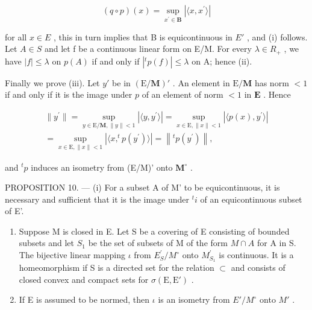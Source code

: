 \[
(q \circ p) (x) = \sup _ {x ^ {\prime} \in \mathbf {B}} | \langle x, x ^ {\prime} \rangle |
\]

for all \(x \in E\) , this in turn implies that B is equicontinuous in \(E'\) , and (i) follows. Let \(A \in S\) and let f be a continuous linear form on E/M. For every \(\lambda \in R_{+}\) , we have \(|f| \leqslant \lambda\) on \(p(A)\) if and only if \(|^{t}p(f)| \leqslant \lambda\) on A; hence (ii).

Finally we prove (iii). Let \(y'\) be in \((\mathrm{E} / \mathbf{M})'\) . An element in \(\mathrm{E} / \mathbf{M}\) has norm \(< 1\) if and only if it is the image under \(p\) of an element of norm \(< 1\) in \(\mathbf{E}\) . Hence

\[
\begin{array}{l} \| y ^ {\prime} \| = \sup _ {y \in \mathrm{E} / \mathbf {M}, \| y \| <   1} \left| \langle y, y ^ {\prime} \rangle \right| = \sup _ {x \in \mathrm{E}, \| x \| <   1} \left| \langle p (x), y ^ {\prime} \rangle \right| \\ = \sup _ {x \in \mathrm{E}, \| x \| <   1} \left| \langle x, ^ {t} p (y ^ {\prime}) \rangle \right| = \left\| ^ {t} p (y ^ {\prime}) \right\|, \end{array}
\]

and \({}^t p\) induces an isometry from (E/M)' onto \({\mathbf{M}}^{ \circ  }\) .

PROPOSITION 10. --- (i) For a subset A of M' to be equicontinuous, it is necessary and sufficient that it is the image under \({}^t i\) of an equicontinuous subset of E'.

\begin{enumerate}
\def\labelenumi{(\roman{enumi})}
\setcounter{enumi}{1}
\item
  Suppose M is closed in E. Let S be a covering of E consisting of bounded subsets and let \(S_{1}\) be the set of subsets of M of the form \(M \cap A\) for A in S. The bijective linear mapping \(\iota\) from \(E_{S}^{\prime}/M^{\circ}\) onto \(M_{S_{1}}^{\prime}\) is continuous. It is a homeomorphism if S is a directed set for the relation \(\subset\) and consists of closed convex and compact sets for \(\sigma(\mathrm{E}, \mathrm{E}')\) .
\item
  If E is assumed to be normed, then \(\iota\) is an isometry from \(E'/M^{\circ}\) onto \(M'\) .
\end{enumerate}

